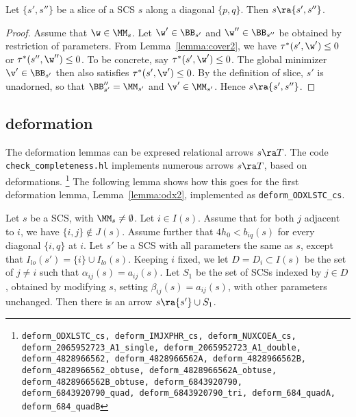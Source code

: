 \begin{lemma}[slice]  Let $\{s',s''\}$ be a slice of
a SCS $s$ along
a diagonal $\{p,q\}$.  
Then   $s\ra\{s',s''\}$.
\end{lemma}

\begin{proof}
Assume that $\w\in\MM_s$.
Let $\w'\in \BB_{s'}$ and $\w''\in \BB_{s''}$ be obtained
by restriction of parameters.  From Lemma~\ref{lemma:cover2},
we have $\tau^*(s',\w')\le 0$ or $\tau^*(s'',\w'')\le0$.  To be
concrete, say $\tau^*(s',\w')\le 0$.  The global minimizer
$\v'\in\BB_{s'}$
then also satisfies $\tau^*(s',\v')\le 0$.  By the definition of
slice, $s'$ is unadorned, so that $\BB''_{s'}=\MM_{s'}$ and
$\v'\in \MM_{s'}$.  Hence $s\ra\{s',s''\}$.
\end{proof}


\subsection{deformation}

The deformation lemmas can be expresed relational
arrows $s\ra T$.  The code {\tt check\_completeness.hl} implements
numerous arrows $s\ra T$, based on deformations.%
\footnote{\tt deform\_ODXLSTC\_cs,
deform\_IMJXPHR\_cs,
deform\_NUXCOEA\_cs,
deform\_2065952723\_A1\_single,
deform\_2065952723\_A1\_double,
deform\_4828966562,
deform\_4828966562A,
deform\_4828966562B,
deform\_4828966562\_obtuse,
deform\_4828966562A\_obtuse,
deform\_4828966562B\_obtuse,
deform\_6843920790,
deform\_6843920790\_quad,
deform\_6843920790\_tri,
deform\_684\_quadA,
deform\_684\_quadB}
The following lemma shows how this goes
for the first deformation lemma, Lemma~\ref{lemma:odx2}, implemented as
{\tt deform\_ODXLSTC\_cs}.

\begin{lemma}[deformation]  
Let $s$ be a SCS, with $\MM_s\ne\emptyset$.  Let $i\in I(s)$.
Assume that for both $j$ adjacent to $i$, we have $\{i,j\}\not\in
J(s)$.
Assume further that $4h_0 < b_{iq}(s)$ for every diagonal $\{i,q\}$ at
$i$.  Let $s'$ be a SCS with all parameters
the same as $s$, except that $I_{lo}(s') = \{i\}\cup I_{lo}(s)$.
Keeping $i$ fixed, we
let $D=D_i\subset I(s)$ be the set of $j\ne i$ such that 
$\alpha_{ij}(s)=a_{ij}(s)$. 
Let $S_1$ be the set of SCSs indexed by $j\in
D$,
obtained by
modifying $s$, setting $\beta_{ij}(s)=a_{ij}(s)$, with other
parameters unchanged.
Then there is an arrow $s\ra \{s'\}\cup S_1$.  
\end{lemma}


